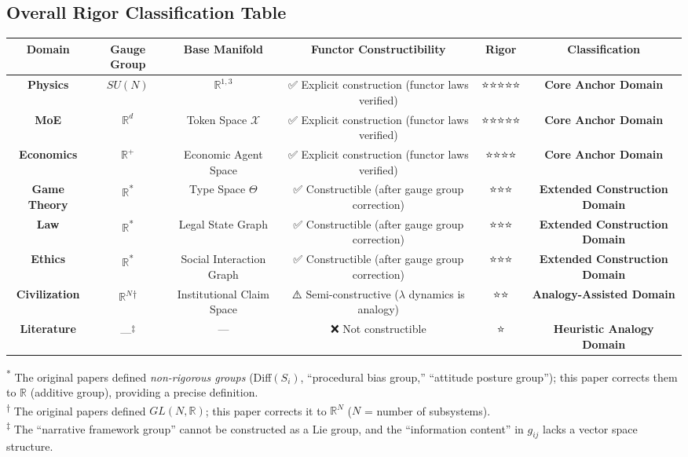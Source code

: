 \documentclass[12pt,a4paper]{article}
\theoremstyle{plain}
\theoremstyle{definition}
\newcommand{\R}{\mathbb{R}}
\begin{document}
\subsection{Overall Rigor Classification Table}

\begin{center}
\begin{tabular}{c|c|c|c|c|c}
    \toprule
    \textbf{Domain} & \textbf{Gauge Group} & \textbf{Base Manifold} & \textbf{Functor Constructibility} & \textbf{Rigor} & \textbf{Classification} \\
    \midrule
    \textbf{Physics} & $SU(N)$ & $\R^{1,3}$ & ✅ Explicit construction (functor laws verified) & ⭐⭐⭐⭐⭐ & \textbf{Core Anchor Domain} \\
    \textbf{MoE} & $\R^d$ & Token Space $\mathcal{X}$ & ✅ Explicit construction (functor laws verified) & ⭐⭐⭐⭐⭐ & \textbf{Core Anchor Domain} \\
    \textbf{Economics} & $\R^+$ & Economic Agent Space & ✅ Explicit construction (functor laws verified) & ⭐⭐⭐⭐ & \textbf{Core Anchor Domain} \\
    \midrule
    \textbf{Game Theory} & $\R$\textsuperscript{*} & Type Space $\Theta$ & ✅ Constructible (after gauge group correction) & ⭐⭐⭐ & \textbf{Extended Construction Domain} \\
    \textbf{Law} & $\R$\textsuperscript{*} & Legal State Graph & ✅ Constructible (after gauge group correction) & ⭐⭐⭐ & \textbf{Extended Construction Domain} \\
    \textbf{Ethics} & $\R$\textsuperscript{*} & Social Interaction Graph & ✅ Constructible (after gauge group correction) & ⭐⭐⭐ & \textbf{Extended Construction Domain} \\
    \midrule
    \textbf{Civilization} & $\R^N$\textsuperscript{†} & Institutional Claim Space & ⚠️ Semi-constructive ($\lambda$ dynamics is analogy) & ⭐⭐ & \textbf{Analogy-Assisted Domain} \\
    \textbf{Literature} & —\textsuperscript{‡} & — & ❌ Not constructible & ⭐ & \textbf{Heuristic Analogy Domain} \\
    \bottomrule
\end{tabular}
\end{center}

\vspace{4pt}
\textsuperscript{*} The original papers defined \textit{non-rigorous groups} (Diff$(S_i)$, ``procedural bias group,'' ``attitude posture group''); this paper corrects them to $\R$ (additive group), providing a precise definition.\\
\textsuperscript{†} The original papers defined $GL(N,\R)$; this paper corrects it to $\R^N$ ($N$ = number of subsystems).\\
\textsuperscript{‡} The ``narrative framework group'' cannot be constructed as a Lie group, and the ``information content'' in $g_{ij}$ lacks a vector space structure.
\end{document}

